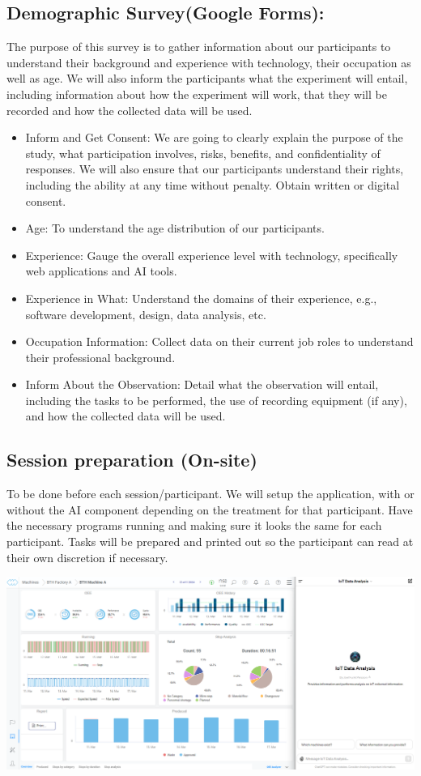 \subsection{Demographic Survey(Google Forms):}
The purpose of this survey is to gather information about our participants to understand their background and experience with technology, their occupation as well as age. We will also inform the participants what the experiment will entail, including information about how the experiment will work, that they will be recorded and how the collected data will be used.

\begin{itemize}
    \item Inform and Get Consent: We are going to clearly explain the purpose of the study, what participation involves, risks, benefits, and confidentiality of responses. We will also ensure that our participants understand their rights, including the ability at any time without penalty. Obtain written or digital consent.
    \item Age: To understand the age distribution of our participants.
    \item Experience: Gauge the overall experience level with technology, specifically web applications and AI tools.
    \item Experience in What: Understand the domains of their experience, e.g., software development, design, data analysis, etc.
    \item Occupation Information: Collect data on their current job roles to understand their professional background.
    \item Inform About the Observation: Detail what the observation will entail, including the tasks to be performed, the use of recording equipment (if any), and how the collected data will be used.
\end{itemize}

\subsection{Session preparation (On-site)}
To be done before each session/participant. We will setup the application, with or without the AI component depending on the treatment for that participant. Have the necessary programs running and making sure it looks the same for each participant. Tasks will be prepared and printed out so the participant can read at their own discretion if necessary.

\includegraphics[width=\textwidth]{Images/experiment_ai_setup.png}

